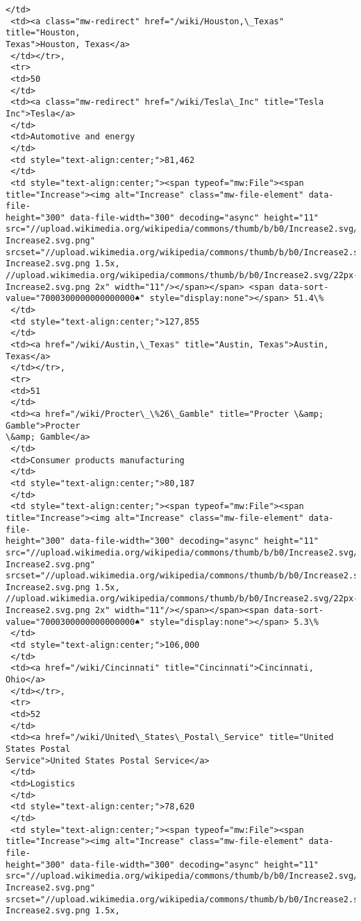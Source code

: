\documentclass[11pt]{article}
\begin{document}
\begin{tcolorbox}[breakable, size=fbox, boxrule=.5pt, pad at break*=1mm, opacityfill=0]
\begin{Verbatim}[commandchars=\\\{\}]
 </td>
 <td><a class="mw-redirect" href="/wiki/Houston,\_Texas" title="Houston,
Texas">Houston, Texas</a>
 </td></tr>,
 <tr>
 <td>50
 </td>
 <td><a class="mw-redirect" href="/wiki/Tesla\_Inc" title="Tesla Inc">Tesla</a>
 </td>
 <td>Automotive and energy
 </td>
 <td style="text-align:center;">81,462
 </td>
 <td style="text-align:center;"><span typeof="mw:File"><span
title="Increase"><img alt="Increase" class="mw-file-element" data-file-
height="300" data-file-width="300" decoding="async" height="11"
src="//upload.wikimedia.org/wikipedia/commons/thumb/b/b0/Increase2.svg/11px-
Increase2.svg.png"
srcset="//upload.wikimedia.org/wikipedia/commons/thumb/b/b0/Increase2.svg/17px-
Increase2.svg.png 1.5x,
//upload.wikimedia.org/wikipedia/commons/thumb/b/b0/Increase2.svg/22px-
Increase2.svg.png 2x" width="11"/></span></span> <span data-sort-
value="7000300000000000000♠" style="display:none"></span> 51.4\%
 </td>
 <td style="text-align:center;">127,855
 </td>
 <td><a href="/wiki/Austin,\_Texas" title="Austin, Texas">Austin, Texas</a>
 </td></tr>,
 <tr>
 <td>51
 </td>
 <td><a href="/wiki/Procter\_\%26\_Gamble" title="Procter \&amp; Gamble">Procter
\&amp; Gamble</a>
 </td>
 <td>Consumer products manufacturing
 </td>
 <td style="text-align:center;">80,187
 </td>
 <td style="text-align:center;"><span typeof="mw:File"><span
title="Increase"><img alt="Increase" class="mw-file-element" data-file-
height="300" data-file-width="300" decoding="async" height="11"
src="//upload.wikimedia.org/wikipedia/commons/thumb/b/b0/Increase2.svg/11px-
Increase2.svg.png"
srcset="//upload.wikimedia.org/wikipedia/commons/thumb/b/b0/Increase2.svg/17px-
Increase2.svg.png 1.5x,
//upload.wikimedia.org/wikipedia/commons/thumb/b/b0/Increase2.svg/22px-
Increase2.svg.png 2x" width="11"/></span></span><span data-sort-
value="7000300000000000000♠" style="display:none"></span> 5.3\%
 </td>
 <td style="text-align:center;">106,000
 </td>
 <td><a href="/wiki/Cincinnati" title="Cincinnati">Cincinnati, Ohio</a>
 </td></tr>,
 <tr>
 <td>52
 </td>
 <td><a href="/wiki/United\_States\_Postal\_Service" title="United States Postal
Service">United States Postal Service</a>
 </td>
 <td>Logistics
 </td>
 <td style="text-align:center;">78,620
 </td>
 <td style="text-align:center;"><span typeof="mw:File"><span
title="Increase"><img alt="Increase" class="mw-file-element" data-file-
height="300" data-file-width="300" decoding="async" height="11"
src="//upload.wikimedia.org/wikipedia/commons/thumb/b/b0/Increase2.svg/11px-
Increase2.svg.png"
srcset="//upload.wikimedia.org/wikipedia/commons/thumb/b/b0/Increase2.svg/17px-
Increase2.svg.png 1.5x,

\end{Verbatim}
\end{tcolorbox}
\end{document}
